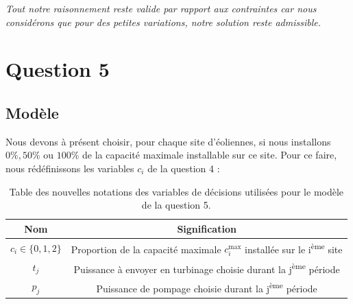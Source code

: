 \documentclass{article}
\begin{document}
\noindent \textit{Tout notre raisonnement reste valide par rapport aux contraintes car nous considérons que pour des petites variations, notre solution reste admissible.}

\newpage
\section*{Question 5}

\subsection*{Modèle}
Nous devons à présent choisir, pour chaque site d'éoliennes, si nous installons $0\%, 50\%$ ou $100\%$ de la capacité maximale installable sur ce site.
Pour ce faire, nous rédéfinissons les variables $c_i$ de la question 4 :

\begin{table}[h!]
    \centering
    \renewcommand{\arraystretch}{1.5}%
    \begin{tabular}{|c || c |} 
        \hline
        Nom & Signification\\
        \hline\hline
        $c_{i} \in \{ 0, 1, 2 \}$ & Proportion de la capacité maximale $c_i^\mathrm{max}$ installée sur le i\textsuperscript{ème} site\\
        $t_j$ & Puissance à envoyer en turbinage choisie durant la j\textsuperscript{ème} période\\
        $p_j$ & Puissance de pompage choisie durant la j\textsuperscript{ème} période\\
        \hline
    \end{tabular}
    \caption{Table des nouvelles notations des variables de décisions utilisées pour le modèle de la question 5.}
    \label{table:notations_variables_5}
\end{table} 
\end{document}
